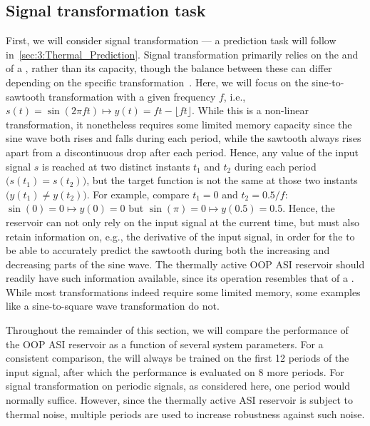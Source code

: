 \subsection{Signal transformation task}
First, we will consider signal transformation --- a prediction task will follow in~\cref{sec:3:Thermal_Prediction}.
Signal transformation primarily relies on the  and  of a , rather than its  capacity, though the balance between these can differ depending on the specific transformation~\cite{FewMoleculeReservoir,gartside2022reconfigurable,TaskAdaptivePRC}.
Here, we will focus on the sine-to-sawtooth transformation with a given frequency $f$, i.e., $s(t) = \sin(2 \pi f t) \mapsto y(t) = ft - \lfloor ft \rfloor$.
While this is a non-linear transformation, it nonetheless requires some limited memory capacity since the sine wave both rises and falls during each period, while the sawtooth always rises apart from a discontinuous drop after each period.
Hence, any value of the input signal $s$ is reached at two distinct instants $t_1$ and $t_2$ during each period $\big(s(t_1) = s(t_2)\big)$, but the target function is not the same at those two instants $\big(y(t_1) \neq y(t_2)\big)$. %
For example, compare $t_1 = 0$ and $t_2 = 0.5/f$: $\sin(0) = 0 \mapsto y(0) = 0$ but $\sin(\pi) = 0 \mapsto y(0.5) = 0.5$.
Hence, the reservoir can not only rely on the input signal at the current time, but must also retain information on, e.g., the derivative of the input signal, in order for the  to be able to accurately predict the sawtooth during both the increasing and decreasing parts of the sine wave.
The thermally active OOP ASI reservoir should readily have such information available, since its operation resembles that of a .
While most transformations indeed require some limited memory, some examples like a sine-to-square wave transformation do not. \par
Throughout the remainder of this section, we will compare the performance of the OOP ASI reservoir as a function of several system parameters.
For a consistent comparison, the  will always be trained on the first 12 periods of the input signal, after which the  performance is evaluated on 8 more periods.
For signal transformation on periodic signals, as considered here, one period would normally suffice.
However, since the thermally active ASI reservoir is subject to thermal noise, multiple periods are used to increase robustness against such noise.

